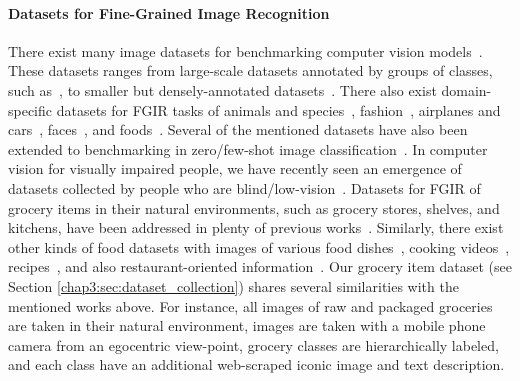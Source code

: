 \vspace{-3mm}
\paragraph{Datasets for Fine-Grained Image Recognition}
There exist many image datasets for benchmarking computer vision models~\cite{deng2009imagenet, nilsback2008automated, wah2011cub, krizhevsky2009learning, lin2014microsoft, van2018inaturalist, massiceti2021orbit, barbu2019objectnet}. These datasets ranges from large-scale datasets annotated by groups of classes, such as~\cite{deng2009imagenet, kuznetsova2020open}, to smaller but densely-annotated datasets~\cite{everingham2010pascal, lin2014microsoft, krishna2017visual, gupta2019lvis}. There also exist domain-specific datasets for FGIR tasks of animals and species~\cite{van2018inaturalist, van2021benchmarking, van2015building, parkhi12a, lampert2009learning}, %
fashion~\cite{liu2016deepfashion, jia2020fashionpedia}, 
airplanes and cars~\cite{vedaldi2014understanding, maji2013fine, krause20133d, gebru2017fine}, %
faces~\cite{parkhi2015deep, huang2008labeled, guo2016ms}, %
and foods~\cite{hou2017vegfru, bossard2014food}. Several of the mentioned datasets have also been extended to benchmarking in zero/few-shot image classification~\cite{lampert2013attribute, reed2016learning, triantafillou2019meta, bujwid2021large}. 
In computer vision for visually impaired people, we have recently seen an emergence of datasets collected by people who are blind/low-vision~\cite{kacorri2017teachable, gurari2018vizwiz, sosa2017hands, massiceti2021orbit, gurari2019vizwiz}. Datasets for FGIR of grocery items in their natural environments, such as grocery stores, shelves, and kitchens, have been addressed in plenty of previous works~\cite{jund2016freiburg, waltner2015mango, george2014recognizing, merler2007recognizing, geng2018fine, wei2019rpc}. Similarly, there exist other kinds of food datasets with images of various food dishes~\cite{bossard2014food, kawano2014automatic, min2019ingredient}, %
cooking videos~\cite{damen2018scaling, damen2021rescaling}, recipes~\cite{marin2019learning, salvador2017learning, yagcioglu2018recipeqa}, and also restaurant-oriented information~\cite{beijbom2015menu, xu2015geolocalized}. Our grocery item dataset (see Section \ref{chap3:sec:dataset_collection}) shares several similarities with the mentioned works above. For instance, all images of raw and packaged groceries are taken in their natural environment, images are taken with a mobile phone camera from an egocentric view-point, grocery classes are hierarchically labeled, and each class have an additional web-scraped iconic image and text description.


